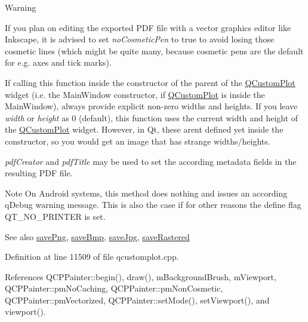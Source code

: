 \begin{DoxyWarning}{Warning}
\begin{DoxyItemize}
\item If you plan on editing the exported P\+D\+F file with a vector graphics editor like Inkscape, it is advised to set {\itshape no\+Cosmetic\+Pen} to true to avoid losing those cosmetic lines (which might be quite many, because cosmetic pens are the default for e.\+g. axes and tick marks). \item If calling this function inside the constructor of the parent of the \hyperlink{class_q_custom_plot}{Q\+Custom\+Plot} widget (i.\+e. the Main\+Window constructor, if \hyperlink{class_q_custom_plot}{Q\+Custom\+Plot} is inside the Main\+Window), always provide explicit non-\/zero widths and heights. If you leave {\itshape width} or {\itshape height} as 0 (default), this function uses the current width and height of the \hyperlink{class_q_custom_plot}{Q\+Custom\+Plot} widget. However, in Qt, these aren\textquotesingle{}t defined yet inside the constructor, so you would get an image that has strange widths/heights.\end{DoxyItemize}
{\itshape pdf\+Creator} and {\itshape pdf\+Title} may be used to set the according metadata fields in the resulting P\+D\+F file.
\end{DoxyWarning}
\begin{DoxyNote}{Note}
On Android systems, this method does nothing and issues an according q\+Debug warning message. This is also the case if for other reasons the define flag Q\+T\+\_\+\+N\+O\+\_\+\+P\+R\+I\+N\+T\+E\+R is set.
\end{DoxyNote}
\begin{DoxySeeAlso}{See also}
\hyperlink{class_q_custom_plot_a7636261aff1f6d25c9da749ece3fc8b8}{save\+Png}, \hyperlink{class_q_custom_plot_a6629d9e8e6da4bf18055ee0257fdce9a}{save\+Bmp}, \hyperlink{class_q_custom_plot_a490c722092d1771e8ce4a7a73dfd84ab}{save\+Jpg}, \hyperlink{class_q_custom_plot_ab528b84cf92baabe29b1d0ef2f77c93e}{save\+Rastered} 
\end{DoxySeeAlso}


Definition at line 11509 of file qcustomplot.\+cpp.



References Q\+C\+P\+Painter\+::begin(), draw(), m\+Background\+Brush, m\+Viewport, Q\+C\+P\+Painter\+::pm\+No\+Caching, Q\+C\+P\+Painter\+::pm\+Non\+Cosmetic, Q\+C\+P\+Painter\+::pm\+Vectorized, Q\+C\+P\+Painter\+::set\+Mode(), set\+Viewport(), and viewport().


